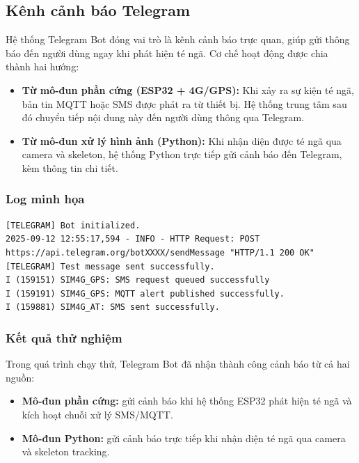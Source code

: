 \subsection{Kênh cảnh báo Telegram}
\label{sec:telegram_alert}

Hệ thống Telegram Bot đóng vai trò là kênh cảnh báo trực quan, giúp gửi thông báo đến người dùng ngay khi phát hiện té ngã.  
Cơ chế hoạt động được chia thành hai hướng:
\begin{itemize}
    \item \textbf{Từ mô-đun phần cứng (ESP32 + 4G/GPS):} Khi xảy ra sự kiện té ngã, bản tin MQTT hoặc SMS được phát ra từ thiết bị. Hệ thống trung tâm sau đó chuyển tiếp nội dung này đến người dùng thông qua Telegram.
    \item \textbf{Từ mô-đun xử lý hình ảnh (Python):} Khi nhận diện được té ngã qua camera và skeleton, hệ thống Python trực tiếp gửi cảnh báo đến Telegram, kèm thông tin chi tiết.
\end{itemize}

\subsubsection*{Log minh họa}
\begin{verbatim}
[TELEGRAM] Bot initialized.
2025-09-12 12:55:17,594 - INFO - HTTP Request: POST
https://api.telegram.org/botXXXX/sendMessage "HTTP/1.1 200 OK"
[TELEGRAM] Test message sent successfully.
I (159151) SIM4G_GPS: SMS request queued successfully
I (159191) SIM4G_GPS: MQTT alert published successfully.
I (159881) SIM4G_AT: SMS sent successfully.
\end{verbatim}

\subsubsection*{Kết quả thử nghiệm}
Trong quá trình chạy thử, Telegram Bot đã nhận thành công cảnh báo từ cả hai nguồn:
\begin{itemize}
    \item \textbf{Mô-đun phần cứng:} gửi cảnh báo khi hệ thống ESP32 phát hiện té ngã và kích hoạt chuỗi xử lý SMS/MQTT.
    \item \textbf{Mô-đun Python:} gửi cảnh báo trực tiếp khi nhận diện té ngã qua camera và skeleton tracking.
\end{itemize}

